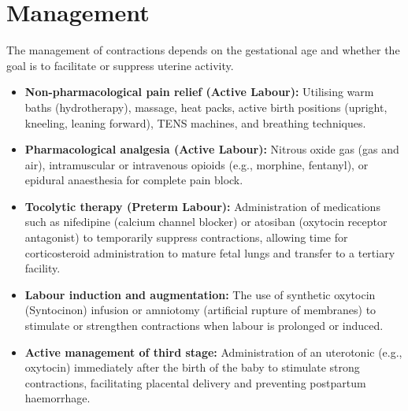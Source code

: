 \section*{Management}
The management of contractions depends on the gestational age and whether the goal is to facilitate or suppress uterine activity.
\begin{itemize}
    \item \textbf{Non-pharmacological pain relief (Active Labour):} Utilising warm baths (hydrotherapy), massage, heat packs, active birth positions (upright, kneeling, leaning forward), TENS machines, and breathing techniques.
    \item \textbf{Pharmacological analgesia (Active Labour):} Nitrous oxide gas (gas and air), intramuscular or intravenous opioids (e.g., morphine, fentanyl), or epidural anaesthesia for complete pain block.
    \item \textbf{Tocolytic therapy (Preterm Labour):} Administration of medications such as nifedipine (calcium channel blocker) or atosiban (oxytocin receptor antagonist) to temporarily suppress contractions, allowing time for corticosteroid administration to mature fetal lungs and transfer to a tertiary facility.
    \item \textbf{Labour induction and augmentation:} The use of synthetic oxytocin (Syntocinon) infusion or amniotomy (artificial rupture of membranes) to stimulate or strengthen contractions when labour is prolonged or induced.
    \item \textbf{Active management of third stage:} Administration of an uterotonic (e.g., oxytocin) immediately after the birth of the baby to stimulate strong contractions, facilitating placental delivery and preventing postpartum haemorrhage.
\end{itemize}

